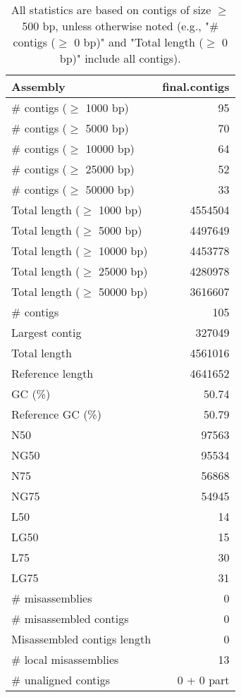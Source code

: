 \documentclass[12pt,a4paper]{article}
\begin{document}
\begin{table}[ht]
\begin{center}
\caption{All statistics are based on contigs of size $\geq$ 500 bp, unless otherwise noted (e.g., "\# contigs ($\geq$ 0 bp)" and "Total length ($\geq$ 0 bp)" include all contigs).}
\begin{tabular}{|l*{1}{|r}|}
\hline
Assembly & final.contigs \\ \hline
\# contigs ($\geq$ 1000 bp) & 95 \\ \hline
\# contigs ($\geq$ 5000 bp) & 70 \\ \hline
\# contigs ($\geq$ 10000 bp) & 64 \\ \hline
\# contigs ($\geq$ 25000 bp) & 52 \\ \hline
\# contigs ($\geq$ 50000 bp) & 33 \\ \hline
Total length ($\geq$ 1000 bp) & 4554504 \\ \hline
Total length ($\geq$ 5000 bp) & 4497649 \\ \hline
Total length ($\geq$ 10000 bp) & 4453778 \\ \hline
Total length ($\geq$ 25000 bp) & 4280978 \\ \hline
Total length ($\geq$ 50000 bp) & 3616607 \\ \hline
\# contigs & 105 \\ \hline
Largest contig & 327049 \\ \hline
Total length & 4561016 \\ \hline
Reference length & 4641652 \\ \hline
GC (\%) & 50.74 \\ \hline
Reference GC (\%) & 50.79 \\ \hline
N50 & 97563 \\ \hline
NG50 & 95534 \\ \hline
N75 & 56868 \\ \hline
NG75 & 54945 \\ \hline
L50 & 14 \\ \hline
LG50 & 15 \\ \hline
L75 & 30 \\ \hline
LG75 & 31 \\ \hline
\# misassemblies & 0 \\ \hline
\# misassembled contigs & 0 \\ \hline
Misassembled contigs length & 0 \\ \hline
\# local misassemblies & 13 \\ \hline
\# unaligned contigs & 0 + 0 part \\ \hline

\end{tabular}
\end{center}
\end{table}
\end{document}
